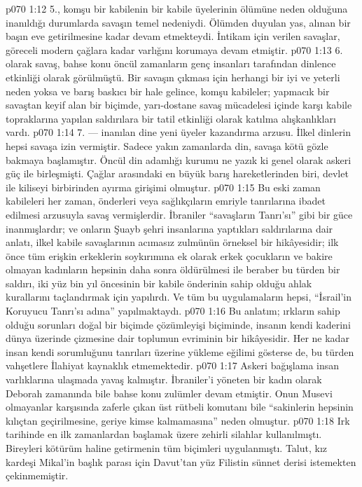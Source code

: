 \vs p070 1:12 5.\bibnobreakspace {}, komşu bir kabilenin bir kabile üyelerinin ölümüne neden olduğuna inanıldığı durumlarda savaşın temel nedeniydi. Ölümden duyulan yas, alınan bir başın eve getirilmesine kadar devam etmekteydi. İntikam için verilen savaşlar, göreceli modern çağlara kadar varlığını korumaya devam etmiştir.
\vs p070 1:13 6.\bibnobreakspace {} olarak savaş, bahse konu öncül zamanların genç insanları tarafından dinlence etkinliği olarak görülmüştü. Bir savaşın çıkması için herhangi bir iyi ve yeterli neden yoksa ve barış baskıcı bir hale gelince, komşu kabileler; yapmacık bir savaştan keyif alan bir biçimde, yarı\hyp{}dostane savaş mücadelesi içinde karşı kabile topraklarına yapılan saldırılara bir tatil etkinliği olarak katılma alışkanlıkları vardı.
\vs p070 1:14 7.\bibnobreakspace {} --- inanılan dine yeni üyeler kazandırma arzusu. İlkel dinlerin hepsi savaşa izin vermiştir. Sadece yakın zamanlarda din, savaşa kötü gözle bakmaya başlamıştır. Öncül din adamlığı kurumu ne yazık ki genel olarak askeri güç ile birleşmişti. Çağlar arasındaki en büyük barış hareketlerinden biri, devlet ile kiliseyi birbirinden ayırma girişimi olmuştur.
\vs p070 1:15 Bu eski zaman kabileleri her zaman, önderleri veya sağlıkçıların emriyle tanrılarına ibadet edilmesi arzusuyla savaş vermişlerdir. İbraniler “savaşların Tanrı’sı” gibi bir güce inanmışlardır; ve onların Şuayb şehri insanlarına yaptıkları saldırılarına dair anlatı, ilkel kabile savaşlarının acımasız zulmünün örneksel bir hikâyesidir; ilk önce tüm erişkin erkeklerin soykırımına ek olarak erkek çocukların ve bakire olmayan kadınların hepsinin daha sonra öldürülmesi ile beraber bu türden bir saldırı, iki yüz bin yıl öncesinin bir kabile önderinin sahip olduğu ahlak kurallarını taçlandırmak için yapılırdı. Ve tüm bu uygulamaların hepsi, “İsrail’in Koruyucu Tanrı’sı adına” yapılmaktaydı.
\vs p070 1:16 Bu anlatım; ırkların sahip olduğu sorunları doğal bir biçimde çözümleyişi biçiminde, insanın kendi kaderini dünya üzerinde çizmesine dair toplumun evriminin bir hikâyesidir. Her ne kadar insan kendi sorumluğunu tanrıları üzerine yükleme eğilimi gösterse de, bu türden vahşetlere İlahiyat kaynaklık etmemektedir.
\vs p070 1:17 Askeri bağışlama insan varlıklarına ulaşmada yavaş kalmıştır. İbraniler’i yöneten bir kadın olarak Deborah zamanında bile bahse konu zulümler devam etmiştir. Onun Musevi olmayanlar karşısında zaferle çıkan üst rütbeli komutanı bile “sakinlerin hepsinin kılıçtan geçirilmesine, geriye kimse kalmamasına” neden olmuştur.
\vs p070 1:18 Irk tarihinde en ilk zamanlardan başlamak üzere zehirli silahlar kullanılmıştı. Bireyleri kötürüm haline getirmenin tüm biçimleri uygulanmıştı. Talut, kız kardeşi Mikal’in başlık parası için Davut’tan yüz Filistin sünnet derisi istemekten çekinmemiştir.
